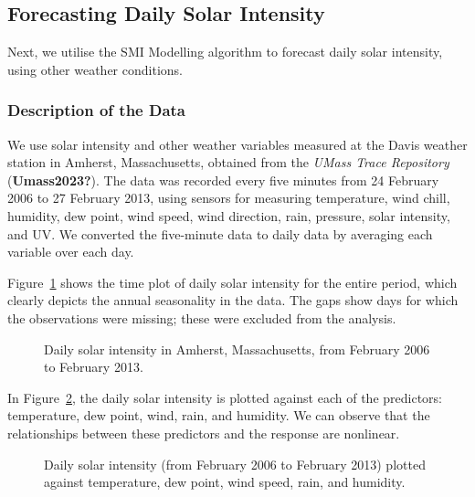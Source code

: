 \documentclass[
  11pt,
  a4paper,
]{report}
\begin{document}
\subsection{Forecasting Daily Solar Intensity}\label{sec-solar}

Next, we utilise the SMI Modelling algorithm to forecast daily solar
intensity, using other weather conditions.

\subsubsection{Description of the Data}\label{description-of-the-data-1}

We use solar intensity and other weather variables measured at the Davis
weather station in Amherst, Massachusetts, obtained from the \emph{UMass
Trace Repository} (\textbf{Umass2023?}). The data was recorded every
five minutes from 24 February 2006 to 27 February 2013, using sensors
for measuring temperature, wind chill, humidity, dew point, wind speed,
wind direction, rain, pressure, solar intensity, and UV. We converted
the five-minute data to daily data by averaging each variable over each
day.

Figure~\ref{fig-solar} shows the time plot of daily solar intensity for
the entire period, which clearly depicts the annual seasonality in the
data. The gaps show days for which the observations were missing; these
were excluded from the analysis.

\begin{figure}


\caption{\label{fig-solar}Daily solar intensity in Amherst,
Massachusetts, from February 2006 to February 2013.}

\end{figure}%

In Figure~\ref{fig-preds}, the daily solar intensity is plotted against
each of the predictors: temperature, dew point, wind, rain, and
humidity. We can observe that the relationships between these predictors
and the response are nonlinear.

\begin{figure}


\caption{\label{fig-preds}Daily solar intensity (from February 2006 to
February 2013) plotted against temperature, dew point, wind speed, rain,
and humidity.}

\end{figure}%
\end{document}
